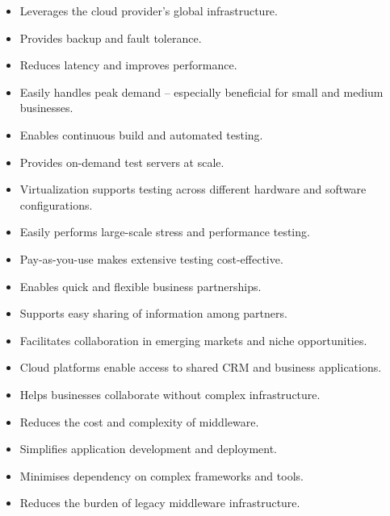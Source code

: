 \documentclass[11pt,a4paper]{article}
\begin{document}

\begin{itemize}\itemsep2pt
  \item Leverages the cloud provider's global infrastructure.
  \item Provides backup and fault tolerance.
  \item Reduces latency and improves performance.
  \item Easily handles peak demand -- especially beneficial for small and medium businesses.
\end{itemize}


\begin{itemize}\itemsep2pt
  \item Enables continuous build and automated testing.
  \item Provides on-demand test servers at scale.
  \item Virtualization supports testing across different hardware and software
        configurations.
  \item Easily performs large-scale stress and performance testing.
  \item Pay-as-you-use makes extensive testing cost-effective.
\end{itemize}


\begin{itemize}\itemsep2pt
  \item Enables quick and flexible business partnerships.
  \item Supports easy sharing of information among partners.
  \item Facilitates collaboration in emerging markets and niche opportunities.
  \item Cloud platforms enable access to shared CRM and business applications.
  \item Helps businesses collaborate without complex infrastructure.
\end{itemize}


\begin{itemize}\itemsep2pt
  \item Reduces the cost and complexity of middleware.
  \item Simplifies application development and deployment.
  \item Minimises dependency on complex frameworks and tools.
  \item Reduces the burden of legacy middleware infrastructure.
\end{itemize}
\end{document}
